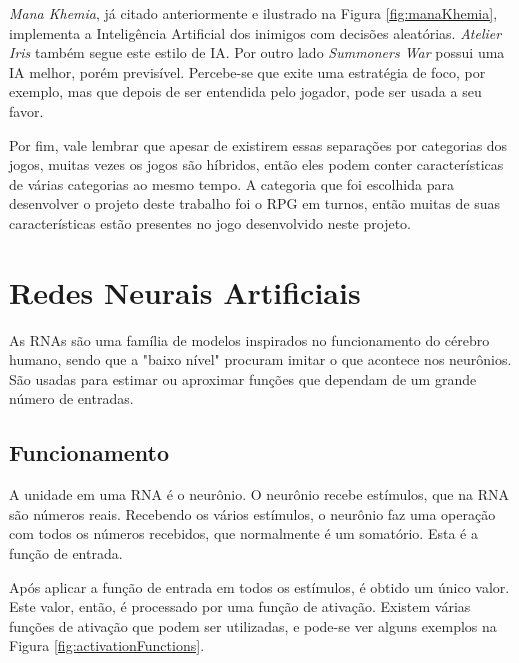 \documentclass[
	12pt,					%
	openright,				%
	oneside,				%
	a4paper,				%
	bibjustif,				%
	chapter=TITLE,			%
	english,				%
	brazil,					%
	]{abntex2}
\begin{document}
		\textit{Mana Khemia}, já citado anteriormente e ilustrado na Figura \ref{fig:manaKhemia},
		implementa a Inteligência Artificial dos inimigos com decisões aleatórias.
		\textit{Atelier Iris} também segue este estilo de IA.
		Por outro lado \textit{Summoners War} possui uma IA melhor, porém previsível.
		Percebe-se que exite uma estratégia de foco, por exemplo,
		mas que depois de ser entendida pelo jogador, pode ser usada a seu favor.
		
		Por fim, vale lembrar que apesar de existirem essas separações por categorias dos jogos,
		muitas vezes os jogos são híbridos,
		então eles podem conter características de várias categorias ao mesmo tempo.
		A categoria que foi escolhida para desenvolver o projeto deste trabalho foi o RPG em turnos,
		então muitas de suas características estão presentes no jogo desenvolvido neste projeto.
		

	\FloatBarrier
	\section{Redes Neurais Artificiais}
	As RNAs são uma família de modelos inspirados no funcionamento do cérebro humano,
	sendo que a "baixo nível"{} procuram imitar o que acontece nos neurônios.
	São usadas para estimar ou aproximar funções que dependam de um grande número de entradas. \cite{bookAI-ANNdefinition}
	
	\subsection{Funcionamento}
	A unidade em uma RNA é o neurônio.
	O neurônio recebe estímulos, que na RNA são números reais.
	Recebendo os vários estímulos, o neurônio faz uma operação com todos os números recebidos,
	que normalmente é um somatório.
	Esta é a função de entrada.
	
	Após aplicar a função de entrada em todos os estímulos,
	é obtido um único valor.
	Este valor, então, é processado por uma função de ativação.
	Existem várias funções de ativação que podem ser utilizadas,
	e pode-se ver alguns exemplos na Figura \ref{fig:activationFunctions}.
	
\end{document}
